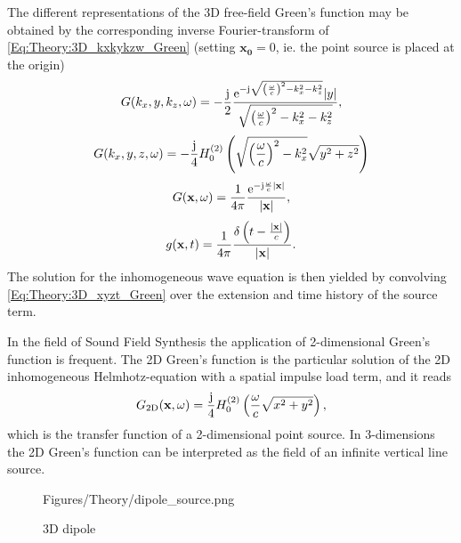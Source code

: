 The different representations of the 3D free-field Green's function may be obtained by the corresponding inverse Fourier-transform of \eqref{Eq:Theory:3D_kxkykzw_Green} (setting $\mathbf{x_0} = 0$, ie. the point source is placed at the origin) \cite{Devaney2012, Ahrens2010a, Ahrens2012}
\begin{equation}
G(k_x,y,k_z,\omega ) = -\frac{\mathrm{j}}{2}\frac{\mathrm{e}^{-\mathrm{j} \sqrt{ \left( \frac{\omega}{c} \right)^2 - k_x^2 - k_z^2  }}|y|}{\sqrt{ \left( \frac{\omega}{c} \right)^2 - k_x^2 - k_z^2  }} ,
\label{Eq:Theory:3D_kxykzw_Green}
\end{equation}
\begin{equation}
G(k_x,y,z,\omega) = -\frac{\mathrm{j}}{4} H_0^{(2)}\left( \sqrt{ \left( \frac{\omega}{c} \right)^2 - k_x^2 } \sqrt{y^2 + z^2} \right)
\label{Eq:Theory:3D_kxyzw_Green}
\end{equation}
\begin{equation}
G(\mathbf{x},\omega) = \frac{1}{4\pi} \frac{\mathrm{e}^{ -\mathrm{j} \frac{\omega}{c}|\mathbf{x}| } }{ |\mathbf{x}| },
\label{Eq:Theory:3D_xyzw_Green}
\end{equation}
\begin{equation}
g(\mathbf{x},t) = \frac{1}{4\pi} \frac{\delta \left( t - \frac{|\mathbf{x}|}{c}  \right)}{|\mathbf{x}|}.
\label{Eq:Theory:3D_xyzt_Green}
\end{equation}
The solution for the inhomogeneous wave equation is then yielded by convolving \eqref{Eq:Theory:3D_xyzt_Green} over the extension and time history of the source term.

In the field of Sound Field Synthesis the application of 2-dimensional Green's function is frequent. The 2D Green's function is the particular solution of the 2D inhomogeneous Helmhotz-equation with a spatial impulse load term, and it reads \cite{Gibson2008}
\begin{equation}
G_{2\mathrm{D}}(\mathbf{x},\omega) = \frac{\mathrm{j}}{4}H_0^{(2)}\left( \frac{\omega}{c} \sqrt{x^2 + y^2} \right),
\end{equation}
which is the transfer function of a 2-dimensional point source.
In 3-dimensions the 2D Green's function can be interpreted as the field of an infinite vertical line source.

\begin{figure}
	\centering
	\begin{overpic}[width = .5\columnwidth]{Figures/Theory/dipole_source.png}
	\end{overpic}
	\caption{3D dipole}
	\label{Fig:Theory:dipole_source}
\end{figure}


